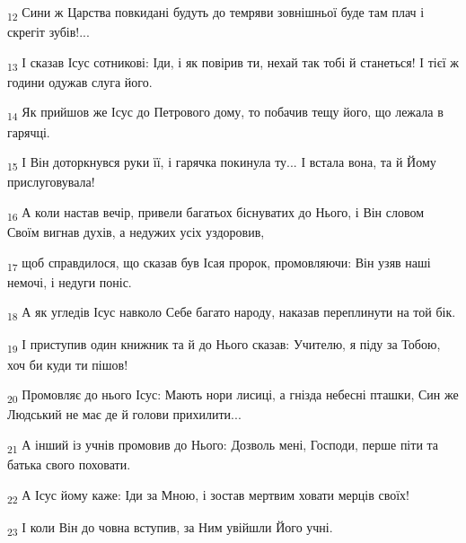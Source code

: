 \begin{tcolorbox}
\textsubscript{12} Сини ж Царства повкидані будуть до темряви зовнішньої буде там плач і скрегіт зубів!...
\end{tcolorbox}
\begin{tcolorbox}
\textsubscript{13} І сказав Ісус сотникові: Іди, і як повірив ти, нехай так тобі й станеться! І тієї ж години одужав слуга його.
\end{tcolorbox}
\begin{tcolorbox}
\textsubscript{14} Як прийшов же Ісус до Петрового дому, то побачив тещу його, що лежала в гарячці.
\end{tcolorbox}
\begin{tcolorbox}
\textsubscript{15} І Він доторкнувся руки її, і гарячка покинула ту... І встала вона, та й Йому прислуговувала!
\end{tcolorbox}
\begin{tcolorbox}
\textsubscript{16} А коли настав вечір, привели багатьох біснуватих до Нього, і Він словом Своїм вигнав духів, а недужих усіх уздоровив,
\end{tcolorbox}
\begin{tcolorbox}
\textsubscript{17} щоб справдилося, що сказав був Ісая пророк, промовляючи: Він узяв наші немочі, і недуги поніс.
\end{tcolorbox}
\begin{tcolorbox}
\textsubscript{18} А як угледів Ісус навколо Себе багато народу, наказав переплинути на той бік.
\end{tcolorbox}
\begin{tcolorbox}
\textsubscript{19} І приступив один книжник та й до Нього сказав: Учителю, я піду за Тобою, хоч би куди ти пішов!
\end{tcolorbox}
\begin{tcolorbox}
\textsubscript{20} Промовляє до нього Ісус: Мають нори лисиці, а гнізда небесні пташки, Син же Людський не має де й голови прихилити...
\end{tcolorbox}
\begin{tcolorbox}
\textsubscript{21} А інший із учнів промовив до Нього: Дозволь мені, Господи, перше піти та батька свого поховати.
\end{tcolorbox}
\begin{tcolorbox}
\textsubscript{22} А Ісус йому каже: Іди за Мною, і зостав мертвим ховати мерців своїх!
\end{tcolorbox}
\begin{tcolorbox}
\textsubscript{23} І коли Він до човна вступив, за Ним увійшли Його учні.
\end{tcolorbox}

